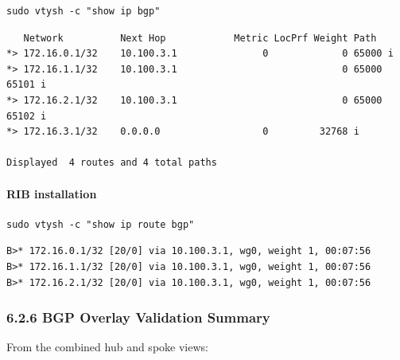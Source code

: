 \documentclass[11pt]{article}
\begin{document}
\begin{verbatim}
sudo vtysh -c "show ip bgp"
\end{verbatim}

\begin{verbatim}
   Network          Next Hop            Metric LocPrf Weight Path
*> 172.16.0.1/32    10.100.3.1               0             0 65000 i
*> 172.16.1.1/32    10.100.3.1                             0 65000 65101 i
*> 172.16.2.1/32    10.100.3.1                             0 65000 65102 i
*> 172.16.3.1/32    0.0.0.0                  0         32768 i

Displayed  4 routes and 4 total paths
\end{verbatim}

\paragraph{RIB installation}

\begin{verbatim}
sudo vtysh -c "show ip route bgp"
\end{verbatim}

\begin{verbatim}
B>* 172.16.0.1/32 [20/0] via 10.100.3.1, wg0, weight 1, 00:07:56
B>* 172.16.1.1/32 [20/0] via 10.100.3.1, wg0, weight 1, 00:07:56
B>* 172.16.2.1/32 [20/0] via 10.100.3.1, wg0, weight 1, 00:07:56
\end{verbatim}

%
%
%
\subsubsection{6.2.6 BGP Overlay Validation Summary}
\label{sec:bgp-overlay-validation-summary}

From the combined hub and spoke views:
\end{document}
